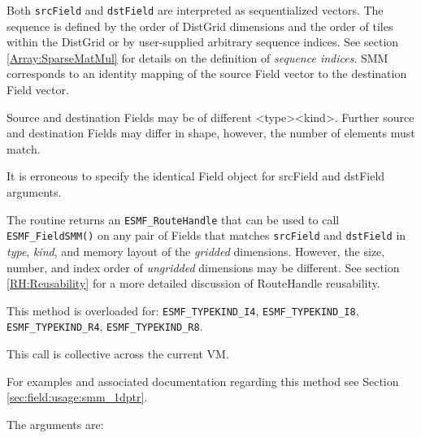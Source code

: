    Both {\tt srcField} and {\tt dstField} are interpreted as sequentialized 
   vectors. The 
   sequence is defined by the order of DistGrid dimensions and the order of 
   tiles within the DistGrid or by user-supplied arbitrary sequence indices. See 
   section \ref{Array:SparseMatMul} for details on the definition of {\em sequence indices}. 
   SMM corresponds to an identity mapping of the source Field vector to 
   the destination Field vector. 
    
   Source and destination Fields may be of different <type><kind>. Further source 
   and destination Fields may differ in shape, however, the number of elements 
   must match. 
    
   It is erroneous to specify the identical Field object for srcField and dstField 
   arguments. 
    
     The routine returns an {\tt ESMF\_RouteHandle} that can be used to call 
     {\tt ESMF\_FieldSMM()} on any pair of Fields that matches 
     {\tt srcField} and {\tt dstField} in {\em type}, {\em kind}, and 
     memory layout of the {\em gridded} dimensions. However, the size, number, 
     and index order of {\em ungridded} dimensions may be different. See section
     \ref{RH:Reusability} for a more detailed discussion of RouteHandle 
     reusability.
    
   This method is overloaded for:\newline
   {\tt ESMF\_TYPEKIND\_I4}, {\tt ESMF\_TYPEKIND\_I8},\newline 
   {\tt ESMF\_TYPEKIND\_R4}, {\tt ESMF\_TYPEKIND\_R8}.
   \newline
  
   This call is collective across the current VM.  
   
   For examples and associated documentation regarding this method see Section
   \ref{sec:field:usage:smm_1dptr}. 
   
   The arguments are:
  
